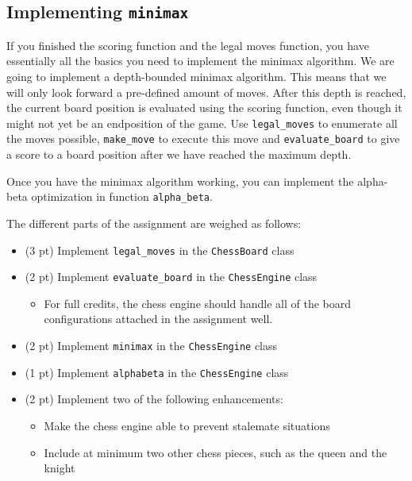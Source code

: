 \subsection{Implementing \texttt{minimax}}
If you finished the scoring function and the legal moves function, you have essentially all the basics you need to implement the minimax algorithm. We are going to implement a depth-bounded minimax algorithm. This means that we will only look forward a pre-defined amount of moves. After this depth is reached, the current board position is evaluated using the scoring function, even though it might not yet be an endposition of the game. Use \texttt{legal\_moves} to enumerate all the moves possible, \texttt{make\_move} to execute this move and \texttt{evaluate\_board} to give a score to a board position after we have reached the maximum depth.

Once you have the minimax algorithm working, you can implement the alpha-beta optimization in function \texttt{alpha\_beta}.

The different parts of the assignment are weighed as follows:
\begin{itemize}
    \item (3 pt) Implement \texttt{legal\_moves} in the \texttt{ChessBoard} class
    \item (2 pt) Implement \texttt{evaluate\_board} in the \texttt{ChessEngine} class
        \begin{itemize}
            \item For full credits, the chess engine should handle all of the board configurations attached in the assignment well.
        \end{itemize}
    \item (2 pt) Implement \texttt{minimax} in the \texttt{ChessEngine} class
    \item (1 pt) Implement \texttt{alphabeta} in the \texttt{ChessEngine} class
    \item (2 pt) Implement two of the following enhancements:
        \begin{itemize}           
            \item Make the chess engine able to prevent stalemate situations
            \item Include at minimum two other chess pieces, such as the queen and the knight
        \end{itemize}
\end{itemize}